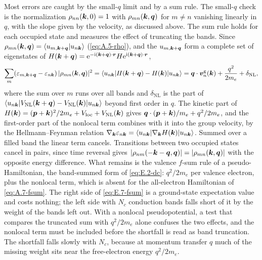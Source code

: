 Most errors are caught by the small-$q$ limit and by a sum rule. The small-$q$ check is the normalization $\rho_{nn}(\bm{k},0) = 1$ with $\rho_{mn}(\bm{k},\bm{q})$ for $m \neq n$ vanishing linearly in $q$, with the slope given by the velocity, as discussed above. The sum rule holds for each occupied state and measures the effect of truncating the bands. Since $\rho_{mn}(\bm{k},\bm{q}) = \langle u_{m,\bm{k}+\bm{q}}|u_{n\bm{k}}\rangle$ (\cref{eq:A.5-rho}), and the $u_{m,\bm{k}+\bm{q}}$ form a complete set of eigenstates of $H(\bm{k}+\bm{q}) = \mathrm{e}^{-\mathrm{i}(\bm{k}+\bm{q})\cdot\bm{r}}H\mathrm{e}^{\mathrm{i}(\bm{k}+\bm{q})\cdot\bm{r}}$,
\begin{equation}
  \sum_m(\varepsilon_{m,\bm{k}+\bm{q}} - \varepsilon_{n\bm{k}})\,|\rho_{mn}(\bm{k},\bm{q})|^2 = \langle u_{n\bm{k}}|H(\bm{k}+\bm{q}) - H(\bm{k})|u_{n\bm{k}}\rangle
  = \bm{q}\cdot\bm{v}^{\mathrm{g}}_n(\bm{k}) + \frac{q^2}{2m_e} + \delta_{\mathrm{NL}} ,
  \label{eq:E.7-fsum}
\end{equation}
where the sum over $m$ runs over all bands and $\delta_{\mathrm{NL}}$ is the part of $\langle u_{n\bm{k}}|V_{\mathrm{NL}}(\bm{k}+\bm{q}) - V_{\mathrm{NL}}(\bm{k})|u_{n\bm{k}}\rangle$ beyond first order in $q$. The kinetic part of $H(\bm{k}) = (\bm{p}+\bm{k})^2/2m_e + V_{\mathrm{loc}} + V_{\mathrm{NL}}(\bm{k})$ gives $\bm{q}\cdot(\bm{p}+\bm{k})/m_e + q^2/2m_e$, and the first-order part of the nonlocal term combines with it into the group velocity, by the Hellmann--Feynman relation $\nabla_{\bm{k}}\varepsilon_{n\bm{k}} = \langle u_{n\bm{k}}|\nabla_{\bm{k}}H(\bm{k})|u_{n\bm{k}}\rangle$. Summed over a filled band the linear term cancels. Transitions between two occupied states cancel in pairs, since time reversal gives $|\rho_{nm}(-\bm{k}-\bm{q},\bm{q})| = |\rho_{mn}(\bm{k},\bm{q})|$ with the opposite energy difference. What remains is the valence $f$-sum rule of a pseudo-Hamiltonian, the band-summed form of \cref{eq:E.2-dc}: $q^2/2m_e$ per valence electron, plus the nonlocal term, which is absent for the all-electron Hamiltonian of \cref{eq:A.7-fsum}. The right side of \cref{eq:E.7-fsum} is a ground-state expectation value and costs nothing; the left side with $N_c$ conduction bands falls short of it by the weight of the bands left out. With a nonlocal pseudopotential, a test that compares the truncated sum with $q^2/2m_e$ alone confuses the two effects, and the nonlocal term must be included before the shortfall is read as band truncation. The shortfall falls slowly with $N_c$, because at momentum transfer $q$ much of the missing weight sits near the free-electron energy $q^2/2m_e$.

